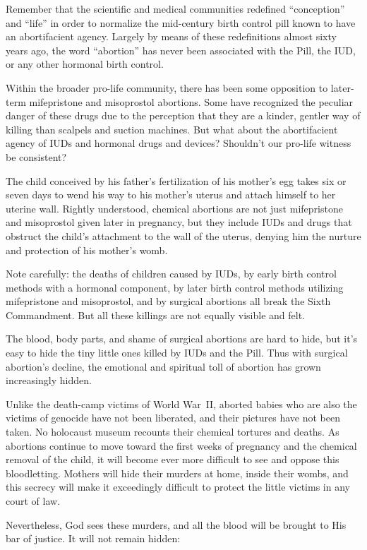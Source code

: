 \documentclass[
]{book}
\begin{document}
Remember that the scientific and medical communities redefined ``conception'' and ``life'' in order to normalize the mid-century birth control pill known to have an abortifacient agency. Largely by means of these redefinitions almost sixty years ago, the word ``abortion'' has never been associated with the Pill, the IUD, or any other hormonal birth control.

Within the broader pro-life community, there has been some opposition to later-term mifepristone and misoprostol abortions. Some have recognized the peculiar danger of these drugs due to the perception that they are a kinder, gentler way of killing than scalpels and suction machines. But what about the abortifacient agency of IUDs and hormonal drugs and devices? Shouldn't our pro-life witness be consistent?

The child conceived by his father's fertilization of his mother's egg takes six or seven days to wend his way to his mother's uterus and attach himself to her uterine wall. Rightly understood, chemical abortions are not just mifepristone and misoprostol given later in pregnancy, but they include IUDs and drugs that obstruct the child's attachment to the wall of the uterus, denying him the nurture and protection of his mother's womb.

Note carefully: the deaths of children caused by IUDs, by early birth control methods with a hormonal component, by later birth control methods utilizing mifepristone and misoprostol, and by surgical abortions all break the Sixth Commandment. But all these killings are not equally visible and felt.

The blood, body parts, and shame of surgical abortions are hard to hide, but it's easy to hide the tiny little ones killed by IUDs and the Pill. Thus with surgical abortion's decline, the emotional and spiritual toll of abortion has grown increasingly hidden.

Unlike the death-camp victims of World War~II, aborted babies who are also the victims of genocide have not been liberated, and their pictures have not been taken. No holocaust museum recounts their chemical tortures and deaths. As abortions continue to move toward the first weeks of pregnancy and the chemical removal of the child, it will become ever more difficult to see and oppose this bloodletting. Mothers will hide their murders at home, inside their wombs, and this secrecy will make it exceedingly difficult to protect the little victims in any court of law.

Nevertheless, God sees these murders, and all the blood will be brought to His bar of justice. It will not remain hidden:
\end{document}

